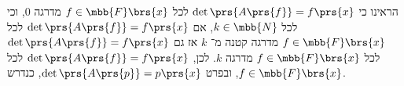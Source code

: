 \documentclass[a4paper,10pt,twoside,openany]{article}
\begin{document}
\begin{solution}
הראינו כי
$\det\prs{A\prs{f}} = f\prs{x}$
לכל
$f \in \mbb{F}\brs{x}$
מדרגה
$0$,
וכי לכל
$k \in \mbb{N}$,
אם
$\det\prs{A\prs{f}} = f\prs{x}$
לכל
$f \in \mbb{F}\brs{x}$
מדרגה קטנה מ־%
$k$
אז גם
$\det\prs{A\prs{f}} = f\prs{x}$
לכל
$f \in \mbb{F}\brs{x}$
מדרגה
$k$.
לכן,
$\det\prs{A\prs{f}} = f\prs{x}$
לכל
$f \in \mbb{F}\brs{x}$,
ובפרט
$\det\prs{A\prs{p}} = p\prs{x}$,
כנדרש.
\end{solution}
\end{document}
